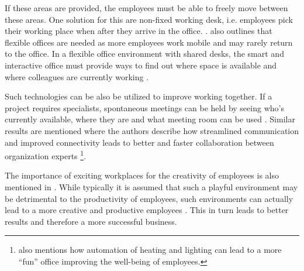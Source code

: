 If these areas are provided, the employees must be able to freely move between these areas. One solution for this are non-fixed working desk, i.e. employees pick their working place when after they arrive in the office. \cite{occupiee}.  also outlines that flexible offices are needed as more employees work mobile and may rarely return to the office. In a flexible office environment with shared desks, the smart and interactive office must provide ways to find out where space is available and where colleagues are currently working \cite{tieto}.

Such technologies can be also be utilized to improve working together. If a project requires specialists, spontaneous meetings can be held by seeing who's currently available, where they are and what meeting room can be used \cite{tieto}. Similar results are mentioned \cite{hbcommunications} where the authors describe how streamlined communication and improved connectivity leads to better and faster collaboration between organization experts \footnote{\cite{hbcommunications} also mentions how automation of heating and lighting can lead to a more ``fun'' office improving the well-being of employees.}.

The importance of exciting workplaces for the creativity of employees is also mentioned in \cite{roomzilla3}. While typically it is assumed that such a playful environment may be detrimental to the productivity of employees, such environments can actually lead to a more creative and productive employees \cite{metroffice}. This in turn leads to better results and therefore a more successful business.



